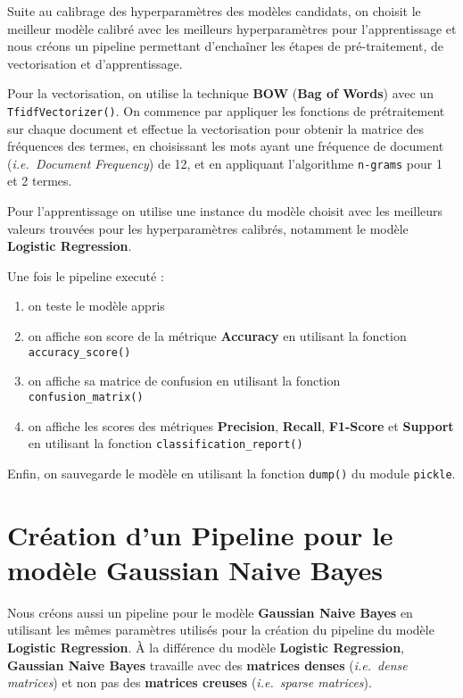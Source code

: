 \documentclass[11pt]{article}
\begin{document}
Suite au calibrage des hyperparamètres des modèles candidats, on choisit
le meilleur modèle calibré avec les meilleurs hyperparamètres pour
l'apprentissage et nous créons un pipeline permettant d'enchaîner les
étapes de pré-traitement, de vectorisation et d'apprentissage.

Pour la vectorisation, on utilise la technique \textbf{BOW} (\textbf{Bag
of Words}) avec un \texttt{TfidfVectorizer()}. On commence par appliquer
les fonctions de prétraitement sur chaque document et effectue la
vectorisation pour obtenir la matrice des fréquences des termes, en
choisissant les mots ayant une fréquence de document
(\emph{i.e.~Document Frequency}) de 12, et en appliquant l'algorithme
\texttt{n-grams} pour 1 et 2 termes.

Pour l'apprentissage on utilise une instance du modèle choisit avec les
meilleurs valeurs trouvées pour les hyperparamètres calibrés, notamment
le modèle \textbf{Logistic Regression}.

Une fois le pipeline executé :
\begin{enumerate}
  \item on teste le modèle appris
  \item on affiche son score de la métrique \textbf{Accuracy} en utilisant la fonction \texttt{accuracy\_score()}
  \item on affiche sa matrice de confusion en utilisant la fonction \texttt{confusion\_matrix()}
  \item on affiche les scores des métriques \textbf{Precision}, \textbf{Recall}, \textbf{F1-Score} et \textbf{Support} en utilisant la fonction \texttt{classification\_report()}
\end{enumerate}

Enfin, on sauvegarde le modèle en utilisant la fonction \texttt{dump()}
du module \texttt{pickle}.



\hypertarget{cruxe9ation-dun-pipeline-pour-le-moduxe8le-gaussian-naive-bayes}{%
\section{Création d'un Pipeline pour le modèle Gaussian Naive
Bayes}\label{cruxe9ation-dun-pipeline-pour-le-moduxe8le-gaussian-naive-bayes}}

Nous créons aussi un pipeline pour le modèle \textbf{Gaussian Naive
Bayes} en utilisant les mêmes paramètres utilisés pour la création du
pipeline du modèle \textbf{Logistic Regression}. À la différence du
modèle \textbf{Logistic Regression}, \textbf{Gaussian Naive Bayes}
travaille avec des \textbf{matrices denses} (\emph{i.e.~dense matrices})
et non pas des \textbf{matrices creuses} (\emph{i.e.~sparse matrices}).
\end{document}
